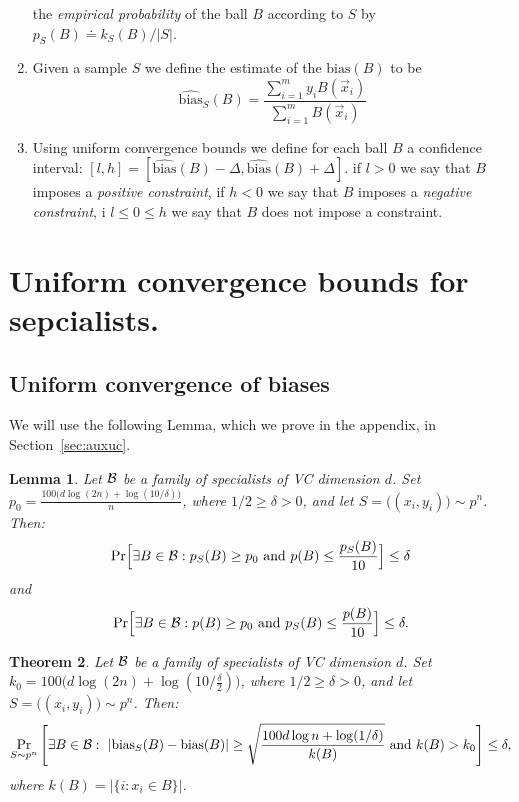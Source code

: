 \documentclass{article}
\newtheorem{theorem}{Theorem}[section]
\newtheorem{lemma}[theorem]{Lemma}
\newcommand{\B}{{\cal B}}
\newcommand{\x}{\vec{x}}
\newcommand{\bias}{\text{bias}}
\newcommand{\ebias}{\widehat{\text{bias}}}
\newcommand{\samp}{S}
\newcommand{\eps}{\epsilon}
\begin{document}
\begin{enumerate}
    the {\em empirical probability} of the ball $B$ according to
    $\samp$ by $p_{\samp}(B) \doteq k_{\samp}(B)/|\samp|$.
  \item Given a sample $\samp$ we define the estimate of the
    $\bias(B)$ to be
    \[
    \ebias_{\samp}(B) = \frac{\sum_{i=1}^m y_i B(\x_i)}{\sum_{i=1}^m B(\x_i)}
    \]
  \item Using uniform convergence bounds we define for each ball $B$
    a confidence interval:
    $[l,h]=[\ebias(B)-\Delta,\ebias(B)+\Delta]$.
    if $l>0$ we say that $B$ imposes a {\em positive constraint}, if
    $h<0$ we say that $B$ imposes a {\em negative constraint}, i
    $l\leq 0 \leq h$ we say that $B$ does not impose a constraint.
\end{enumerate}

\section{Uniform convergence bounds for sepcialists.}

\subsection{Uniform convergence of biases}

We will use the following Lemma, which we prove in the appendix, in Section~\ref{sec:auxuc}.
\begin{lemma}\label{lem:auxuc}
Let $\B$ be a family of specialists of VC dimension $d$.
Set $p_0 = \frac{100\bigl(d\log(2n) + \log(10/\delta)\bigr)}{n}$, 
where $1/2\geq \delta>0$,
and let $S=\bigl((x_i,y_i)\bigr) \sim p^n$.
Then:
\[
\Pr
\Bigl[
\exists {B\in\B}: p_{\samp}(B) \geq p_0 \mbox{ and } p(B) \leq \frac{p_{\samp}(B)}{10}
\Bigr]\leq \delta
\]
and
\[
\Pr
\Bigl[
\exists {B\in\B}: p(B) \geq p_0 \mbox{ and } p_{\samp}(B) \leq \frac{p(B)}{10}
\Bigr]\leq \delta.
\]
\end{lemma}

\begin{theorem} \label{thm:Bias-Convergence}
Let $\B$ be a family of specialists of VC dimension $d$.
Set $k_0 = 100\bigl(d\log(2n) + \log(10/\frac{\delta}{2})\bigr)$, where
 $1/2\geq \delta>0$,
and let $S=\bigl((x_i,y_i)\bigr) \sim p^n$.
Then:
\[\Pr_{\samp\sim p^n}\left[\exists {B\in\B}:~\lvert
  \bias_{\samp}(B) -  \bias(B)\rvert \geq \sqrt{\frac{100d\log n +
      \log(1/\delta)}{k(B)} }
  \mbox{ and } k(B)>k_0
  \right] \leq \delta,
\]
where $k(B) = \lvert\{ i : x_i\in B \}\rvert$.
\end{theorem}
\end{document}
